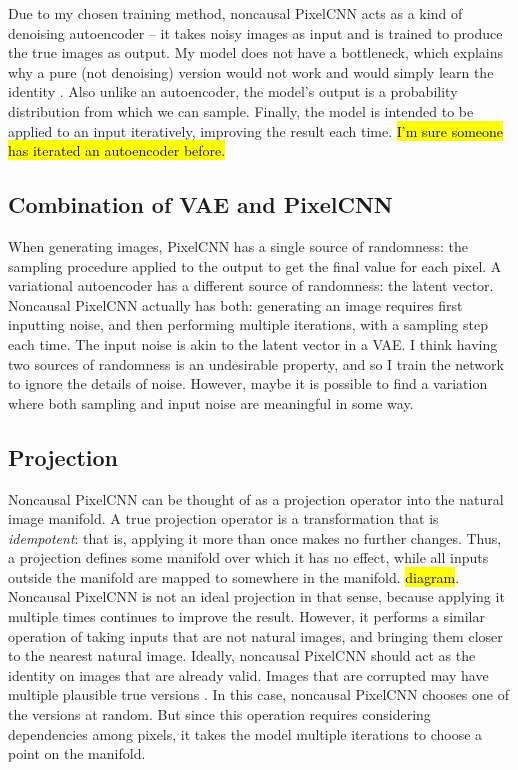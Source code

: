\documentclass[10pt,a4paper]{article}
\begin{document}
Due to my chosen training method, noncausal PixelCNN acts as a kind of denoising autoencoder \cite{??} -- it takes noisy images as input and is trained to produce the true images as output. My model does not have a bottleneck, which explains why a pure (not denoising) version would not work and would simply learn the identity \cite{??}. Also unlike an autoencoder, the model's output is a probability distribution from which we can sample. Finally, the model is intended to be applied to an input iteratively, improving the result each time. \hl{I'm sure someone has iterated an autoencoder before.}

\subsection{Combination of VAE and PixelCNN}

When generating images, PixelCNN has a single source of randomness: the sampling procedure applied to the output to get the final value for each pixel. A variational autoencoder \cite{??} has a different source of randomness: the latent vector. Noncausal PixelCNN actually has both: generating an image requires first inputting noise, and then performing multiple iterations, with a sampling step each time. The input noise is akin to the latent vector in a VAE. I think having two sources of randomness is an undesirable property, and so I train the network to ignore the details of noise. However, maybe it is possible to find a variation where both sampling and input noise are meaningful in some way.

\subsection{Projection}

Noncausal PixelCNN can be thought of as a projection operator into the natural image manifold. A true projection operator \cite{??} is a transformation that is \emph{idempotent}: that is, applying it more than once makes no further changes. Thus, a projection defines some manifold over which it has no effect, while all inputs outside the manifold are mapped to somewhere in the manifold. \hl{diagram}. Noncausal PixelCNN is not an ideal projection in that sense, because applying it multiple times continues to improve the result. However, it performs a similar operation of taking inputs that are not natural images, and bringing them closer to the nearest natural image. Ideally, noncausal PixelCNN should act as the identity on images that are already valid. Images that are corrupted may have multiple plausible true versions \cite{??}. In this case, noncausal PixelCNN chooses one of the versions at random. But since this operation requires considering dependencies among pixels, it takes the model multiple iterations to choose a point on the manifold.
\end{document}
